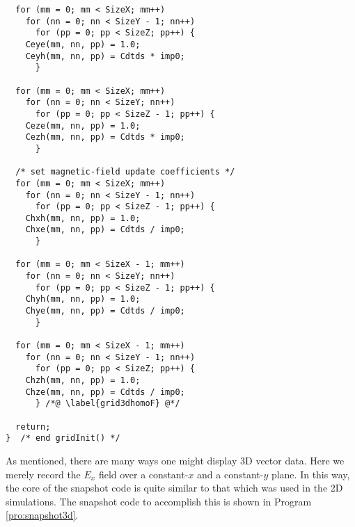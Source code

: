 \begin{program}
\begin{lstlisting}
  for (mm = 0; mm < SizeX; mm++)
    for (nn = 0; nn < SizeY - 1; nn++) 
      for (pp = 0; pp < SizeZ; pp++) {
	Ceye(mm, nn, pp) = 1.0;
	Ceyh(mm, nn, pp) = Cdtds * imp0;
      }

  for (mm = 0; mm < SizeX; mm++)
    for (nn = 0; nn < SizeY; nn++) 
      for (pp = 0; pp < SizeZ - 1; pp++) {
	Ceze(mm, nn, pp) = 1.0;
	Cezh(mm, nn, pp) = Cdtds * imp0;
      }

  /* set magnetic-field update coefficients */
  for (mm = 0; mm < SizeX; mm++)
    for (nn = 0; nn < SizeY - 1; nn++) 
      for (pp = 0; pp < SizeZ - 1; pp++) {
	Chxh(mm, nn, pp) = 1.0;
	Chxe(mm, nn, pp) = Cdtds / imp0;
      }

  for (mm = 0; mm < SizeX - 1; mm++)
    for (nn = 0; nn < SizeY; nn++) 
      for (pp = 0; pp < SizeZ - 1; pp++) {
	Chyh(mm, nn, pp) = 1.0;
	Chye(mm, nn, pp) = Cdtds / imp0;
      }

  for (mm = 0; mm < SizeX - 1; mm++)
    for (nn = 0; nn < SizeY - 1; nn++) 
      for (pp = 0; pp < SizeZ; pp++) {
	Chzh(mm, nn, pp) = 1.0;
	Chze(mm, nn, pp) = Cdtds / imp0;
      } /*@ \label{grid3dhomoF} @*/

  return;
}  /* end gridInit() */
\end{lstlisting}
\end{program}

As mentioned, there are many ways one might display 3D vector data.
Here we merely record the $E_x$ field over a constant-$x$ and a
constant-$y$ plane.  In this way, the core of the snapshot code is
quite similar to that which was used in the 2D simulations.  The
snapshot code to accomplish this is shown in Program
\ref{pro:snapshot3d}.

